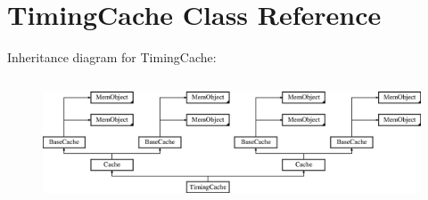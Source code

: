 \hypertarget{classTimingCache}{\section{Timing\-Cache Class Reference}
\label{classTimingCache}
}
Inheritance diagram for Timing\-Cache\-:\begin{figure}[H]
\begin{center}
\leavevmode
\includegraphics[height=3.763441cm]{classTimingCache}
\end{center}
\end{figure}
